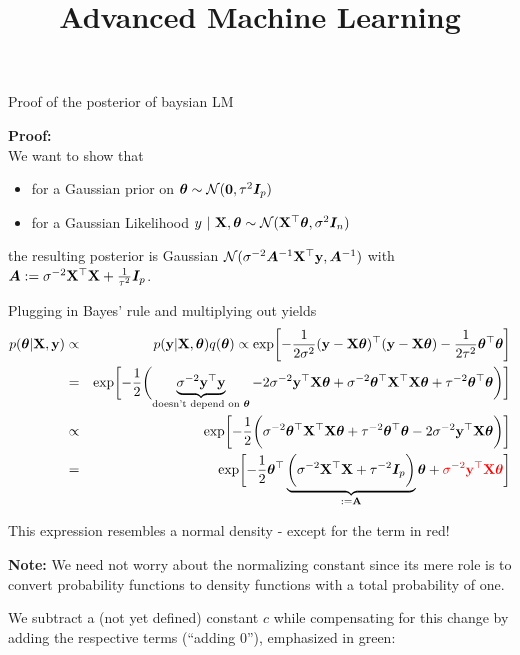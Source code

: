 \documentclass[11pt,compress,t,notes=noshow, xcolor=table]{beamer}
\title{Advanced Machine Learning}
\date{}
\begin{document}

\begin{vbframe}{Proof of the posterior of baysian LM}
\begin{footnotesize}
\textbf{Proof:}\\
    We want to show that 
    \begin{itemize}
      \item for a Gaussian prior on $\bm{\theta} \sim \mathcal{N}(\mathbf{0}, \tau^2 \bm{I}_p)$
      \item for a Gaussian Likelihood $y ~|~ \mathbf{X}, \bm{\theta} \sim \mathcal{N}(\mathbf{X}^\top \bm{\theta}, \sigma^2 \bm{I}_n)$ 
    \end{itemize}
    the resulting posterior is Gaussian $\mathcal{N}(\sigma^{-2}\bm{A}^{-1}\mathbf{X}^\top\mathbf{y}, \bm{A}^{-1})$ with $\bm{A}:= \sigma^{-2}\mathbf{X}^\top\mathbf{X} + \frac{1}{\tau^2} \bm{I}_p$.
    
    Plugging in Bayes' rule and multiplying out yields
    \begin{eqnarray*}
    p(\bm{\theta} | \mathbf{X}, \mathbf{y}) &\propto& p(\mathbf{y} | \mathbf{X}, \bm{\theta}) q(\bm{\theta}) \propto \exp\biggl[-\frac{1}{2\sigma^2}(\mathbf{y} - \mathbf{X}\bm{\theta})^\top(\mathbf{y} - \mathbf{X}\bm{\theta})-\frac{1}{2\tau^2}\bm{\theta}^\top\bm{\theta}\biggr] \\
    &=& \exp\biggl[-\frac{1}{2}\biggl(\underbrace{\sigma^{-2}\mathbf{y}^\top\mathbf{y}}_{\text{doesn't depend on } \bm{\theta}} - 2 \sigma^{-2} \mathbf{y}^\top \mathbf{X} \bm{\theta} + \sigma^{-2}\bm{\theta}^\top \mathbf{X}^\top \mathbf{X} \bm{\theta}  + \tau^{-2} \bm{\theta}^\top\bm{\theta} \biggr)\biggr] \\
    &\propto& \exp\biggl[-\frac{1}{2}\biggl(\sigma^{-2}\bm{\theta}^\top \mathbf{X}^\top \mathbf{X} \bm{\theta}  + \tau^{-2} \bm{\theta}^\top\bm{\theta}  - 2 \sigma^{-2} \mathbf{y}^\top \mathbf{X} \bm{\theta} \biggr)\biggr] \\
    &=& \exp\biggl[-\frac{1}{2}\bm{\theta}^\top\underbrace{\biggl(\sigma^{-2} \mathbf{X}^\top \mathbf{X} + \tau^{-2} \bm{I}_p \biggr)}_{:= \mathbf{A}} \bm{\theta} + \textcolor{red}{\sigma^{-2} \mathbf{y}^\top \mathbf{X} \bm{\theta}}\biggr]
    \end{eqnarray*}
    
    This expression resembles a normal density - except for the term in red!
    
    \framebreak

    \textbf{Note:} We need not worry about the normalizing constant since its mere role is to convert probability functions to density functions with a total probability of one.
    
    
    We subtract a (not yet defined) constant $c$ while compensating for this change by adding the respective terms (\enquote{adding $0$}), emphasized in green:
    

\end{footnotesize}
\end{vbframe}
\end{document}
